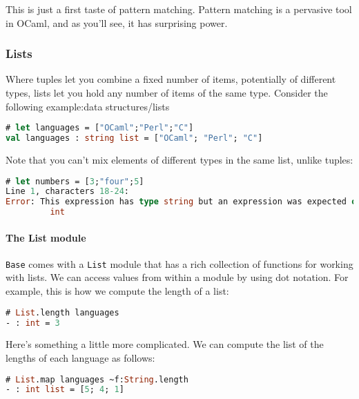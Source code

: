 This is just a first taste of pattern matching. Pattern matching is a
pervasive tool in OCaml, and as you'll see, it has surprising power.

\hypertarget{lists}{%
\subsubsection{Lists}\label{lists}}

Where tuples let you combine a fixed number of items, potentially of
different types, lists let you hold any number of items of the same
type. Consider the following
example:\protect\hypertarget{DSlists}{}{data structures/lists}

\begin{lstlisting}[language=Caml]
# let languages = ["OCaml";"Perl";"C"]
val languages : string list = ["OCaml"; "Perl"; "C"]
\end{lstlisting}

Note that you can't mix elements of different types in the same list,
unlike tuples:

\begin{lstlisting}[language=Caml]
# let numbers = [3;"four";5]
Line 1, characters 18-24:
Error: This expression has type string but an expression was expected of type
         int
\end{lstlisting}

\hypertarget{the-list-module}{%
\paragraph{The List module}\label{the-list-module}}

\passthrough{\lstinline!Base!} comes with a
\passthrough{\lstinline!List!} module that has a rich collection of
functions for working with lists. We can access values from within a
module by using dot notation. For example, this is how we compute the
length of a list:

\begin{lstlisting}[language=Caml]
# List.length languages
- : int = 3
\end{lstlisting}

Here's something a little more complicated. We can compute the list of
the lengths of each language as follows:

\begin{lstlisting}[language=Caml]
# List.map languages ~f:String.length
- : int list = [5; 4; 1]
\end{lstlisting}

